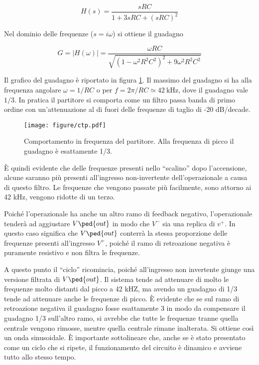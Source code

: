 \begin{equation}
    H(s) = \frac{sRC}{1 + 3sRC + (sRC)^2}
\end{equation}

Nel dominio delle frequenze ($s = i\omega$) si ottiene il guadagno

\begin{equation}
    G = |H(\omega)| = \frac{\omega RC}{\sqrt{(1 - \omega^2R^2C^2)^2 + 9\omega^2R^2C^2}}
\end{equation}

Il grafico del guadagno è riportato in figura \ref{fig:partitore8}. Il massimo del guadagno si ha alla frequenza
angolare $\omega = 1/RC$ o per $f = 2\pi/RC \simeq \SI{42}{\kilo\hertz}$, dove il guadagno vale $1/3$. In pratica il partitore
si comporta come un filtro passa banda di primo ordine con un'attenuazione al di fuori delle frequenze di taglio
di -20 dB/decade.

\begin{figure}
    \centering
    \texttt{[image: figure/ctp.pdf]}
    \caption{Comportamento in frequenza del partitore. Alla frequenza di picco il guadagno è esattamente 1/3.}
    \label{fig:partitore8}
\end{figure}

È quindi evidente che delle frequenze presenti nello ``scalino'' dopo l'accensione, alcune saranno più presenti
all'ingresso non-invertente dell'operazionale a causa di questo filtro. Le frequenze che vengono passate più facilmente,
sono attorno ai 42 kHz, vengono ridotte di un terzo.

Poiché l'operazionale ha anche un altro ramo di feedback negativo, l'operazionale tenderà ad aggiustare $V\ped{out}$
in modo che $V^-$ sia una replica di $v^+$. In questo caso significa che $V\ped{out}$ conterrà la stessa proporzione
delle frequenze presenti all'ingresso $V^+$, poiché il ramo di retroazione negativa è puramente resistivo e non filtra
le frequenze.

A questo punto il ``ciclo'' ricomincia, poiché all'ingresso non invertente giunge una versione filtrata di $V\ped{out}$.
Il sistema tende ad attenuare di molto le frequenze molto distanti dal picco a 42 kHZ, ma avendo un guadagno di 1/3 tende
ad attenuare anche le frequenze di picco. È evidente che se sul ramo di retroazione negativa il guadagno fosse esattamente 3
in modo da compensare il guadagno 1/3 sull'altro ramo,
si avrebbe che tutte le frequenze tranne quella centrale vengono rimosse, mentre quella centrale rimane inalterata.
Si ottiene così un onda sinusoidale. È importante sottolineare che, anche se è stato presentato come un ciclo che si ripete,
il funzionamento del circuito è dinamico e avviene tutto allo stesso tempo.

